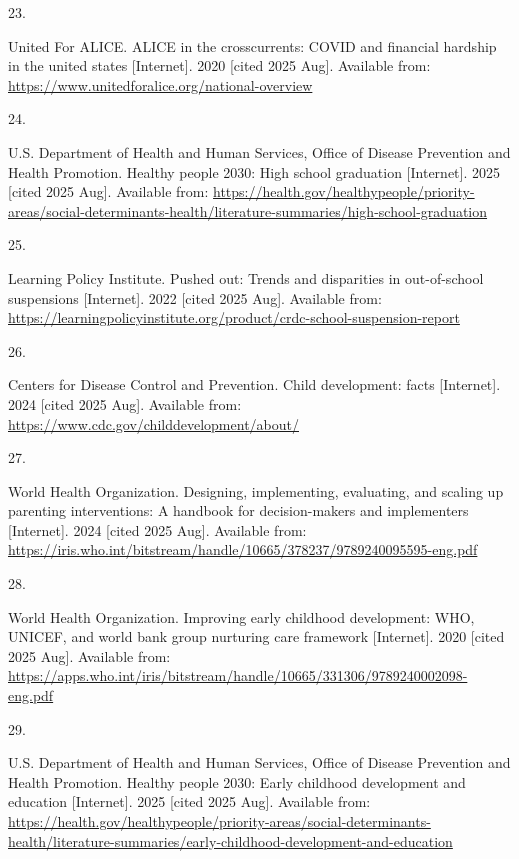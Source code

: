 \documentclass[
  english,
  letterpaper,
]{report}
\newlength{\cslhangindent}
\newlength{\csllabelwidth}
\newenvironment{CSLReferences}[2] %
 {\begin{list}{}{%
  \setlength{\itemindent}{0pt}
  \setlength{\leftmargin}{0pt}
  \setlength{\parsep}{0pt}
  \ifodd #1
   \setlength{\leftmargin}{\cslhangindent}
   \setlength{\itemindent}{-1\cslhangindent}
  \fi
  \setlength{\itemsep}{#2\baselineskip}}}
 {\end{list}}
\newcommand{\CSLLeftMargin}[1]{\parbox[t]{\csllabelwidth}{\strut#1\strut}}
\newcommand{\CSLRightInline}[1]{\parbox[t]{\linewidth - \csllabelwidth}{\strut#1\strut}}
\begin{document}
\begin{CSLReferences}{0}{1}
\CSLLeftMargin{23. }%
\CSLRightInline{United For ALICE. ALICE in the crosscurrents: COVID and
financial hardship in the united states {[}Internet{]}. 2020 {[}cited
2025 Aug{]}. Available from:
\url{https://www.unitedforalice.org/national-overview}}

\CSLLeftMargin{24. }%
\CSLRightInline{U.S. Department of Health and Human Services, Office of
Disease Prevention and Health Promotion. Healthy people 2030: High
school graduation {[}Internet{]}. 2025 {[}cited 2025 Aug{]}. Available
from:
\url{https://health.gov/healthypeople/priority-areas/social-determinants-health/literature-summaries/high-school-graduation}}

\CSLLeftMargin{25. }%
\CSLRightInline{Learning Policy Institute. Pushed out: Trends and
disparities in out-of-school suspensions {[}Internet{]}. 2022 {[}cited
2025 Aug{]}. Available from:
\url{https://learningpolicyinstitute.org/product/crdc-school-suspension-report}}

\CSLLeftMargin{26. }%
\CSLRightInline{Centers for Disease Control and Prevention. Child
development: facts {[}Internet{]}. 2024 {[}cited 2025 Aug{]}. Available
from: \url{https://www.cdc.gov/childdevelopment/about/}}

\CSLLeftMargin{27. }%
\CSLRightInline{World Health Organization. Designing, implementing,
evaluating, and scaling up parenting interventions: A handbook for
decision-makers and implementers {[}Internet{]}. 2024 {[}cited 2025
Aug{]}. Available from:
\url{https://iris.who.int/bitstream/handle/10665/378237/9789240095595-eng.pdf}}

\CSLLeftMargin{28. }%
\CSLRightInline{World Health Organization. Improving early childhood
development: WHO, UNICEF, and world bank group nurturing care framework
{[}Internet{]}. 2020 {[}cited 2025 Aug{]}. Available from:
\url{https://apps.who.int/iris/bitstream/handle/10665/331306/9789240002098-eng.pdf}}

\CSLLeftMargin{29. }%
\CSLRightInline{U.S. Department of Health and Human Services, Office of
Disease Prevention and Health Promotion. Healthy people 2030: Early
childhood development and education {[}Internet{]}. 2025 {[}cited 2025
Aug{]}. Available from:
\url{https://health.gov/healthypeople/priority-areas/social-determinants-health/literature-summaries/early-childhood-development-and-education}}


\end{CSLReferences}
\end{document}
